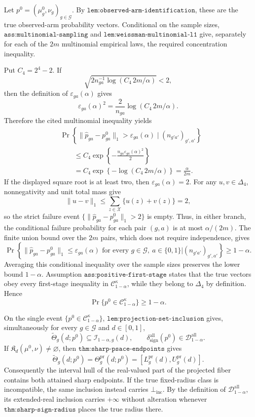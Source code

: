 Let \(p^0=(\mu_g^0,\nu_g)_{g\in\mathcal G}\). By \(\texttt{lem:observed-arm-identification}\), these are the true observed-arm probability vectors. Conditional on the sample sizes, \(\texttt{ass:multinomial-sampling}\) and \(\texttt{lem:weissman-multinomial-l1}\) give, separately for each of the \(2m\) multinomial empirical laws, the required concentration inequality.

Put \(C_4=2^4-2\). If
\[
 \sqrt{2n_{ga}^{-1}\log\!\left(C_4\,2m/\alpha\right)}<2,
\]
then the definition of \(\varepsilon_{ga}(\alpha)\) gives
\[
 \varepsilon_{ga}(\alpha)^2
 =\frac{2}{n_{ga}}\log\!\left(C_4\,2m/\alpha\right).
\]
Therefore the cited multinomial inequality yields
\[
\begin{aligned}
 &\Pr\!\left\{\|\widehat p_{ga}-p^0_{ga}\|_1>
 \varepsilon_{ga}(\alpha)\mid(n_{g'a'})_{g',a'}\right\}\\
 &\qquad\le C_4\exp\!\left\{-\frac{n_{ga}\varepsilon_{ga}(\alpha)^2}{2}\right\}\\
 &\qquad=C_4\exp\!\left\{-\log\!\left(C_4\,2m/\alpha\right)\right\}
 =\frac{\alpha}{2m}.
\end{aligned}
\]
If the displayed square root is at least two, then \(\varepsilon_{ga}(\alpha)=2\). For any \(u,v\in\Delta_4\), nonnegativity and unit total mass give
\[
 \|u-v\|_1\le\sum_{z\in\mathcal X}\{u(z)+v(z)\}=2,
\]
so the strict failure event \(\{\|\widehat p_{ga}-p^0_{ga}\|_1>2\}\) is empty. Thus, in either branch, the conditional failure probability for each pair \((g,a)\) is at most \(\alpha/(2m)\). The finite union bound over the \(2m\) pairs, which does not require independence, gives
\[
 \Pr\!\left\{
 \|\widehat p_{ga}-p^0_{ga}\|_1\le\varepsilon_{ga}(\alpha)
 \text{ for every }g\in\mathcal G,
 \ a\in\{0,1\}
 \mathrel{\Big|}(n_{g'a'})_{g',a'}
 \right\}\ge1-\alpha.
\]
Averaging this conditional inequality over the sample sizes preserves the lower bound \(1-\alpha\). Assumption \(\texttt{ass:positive-first-stage}\) states that the true vectors obey every first-stage inequality in \(\mathcal C_{1-\alpha}^{\kappa}\), while they belong to \(\Delta_4\) by definition. Hence
\[
 \Pr\{p^0\in\mathcal C_{1-\alpha}^{\kappa}\}\ge1-\alpha.
\]

On the single event \(\{p^0\in\mathcal C_{1-\alpha}^{\kappa}\}\), \(\texttt{lem:projection-set-inclusion}\) gives, simultaneously for every \(g\in\mathcal G\) and \(d\in[0,1]\),
\[
 \widetilde\Theta_g(d;p^0)\subseteq\mathcal I_{1-\alpha,g}(d),
 \qquad
 \delta_{\mathrm{sign}}^{\mathrm{all}}(p^0)
 \in\mathcal D_{1-\alpha}^{\mathrm{all}}.
\]
If \(\mathfrak K_d(\mu^0,\nu)\neq\varnothing\), then \(\texttt{thm:sharp-psace-endpoints}\) gives
\[
 \widetilde\Theta_g(d;p^0)=\Theta_g^{\mathrm{pr}}(d;p^0)
 =[L_g^{\mathrm{pr}}(d),U_g^{\mathrm{pr}}(d)].
\]
Consequently the interval hull of the real-valued part of the projected fiber contains both attained sharp endpoints. If the true fixed-radius class is incompatible, the same inclusion instead carries \(\bot_{\mathrm{inc}}\). By the definition of \(\mathcal D_{1-\alpha}^{\mathrm{all}}\), its extended-real inclusion carries \(+\infty\) without alteration whenever \(\texttt{thm:sharp-sign-radius}\) places the true radius there.

